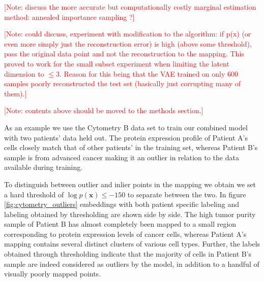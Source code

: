 \textcolor{red}{[Note: discuss the more accurate but computationally costly marginal estimation method: annealed importance sampling \citep{ais, ais_vae}?]}

\textcolor{red}{[Note: could discuss, experiment with modification to the algorithm: if p(x) (or even more simply just the reconstruction error) is high (above some threshold), pass the original data point and not the reconstruction to the mapping. This proved to work for the small subset experiment when limiting the latent dimension to $\leq 3$. Reason for this being that the VAE trained on only 600 samples poorly reconstructed the test set (basically just corrupting many of them).]}

\textcolor{red}{[Note: contents above should be moved to the methods section.]}

As an example we use the Cytometry B data set to train our combined model with two patients' data held out. The protein expression profile of Patient A's cells closely match that of other patients' in the training set, whereas Patient B's sample is from advanced cancer making it an outlier in relation to the data available during training.

To distinguish between outlier and inlier points in the mapping we obtain we set a hard threshold of $\log p(\mathbf{x}) \leq -150$ to separate between the two. In figure \ref{fig:cytometry_outliers} embeddings with both patient specific labeling and labeling obtained by thresholding are shown side by side. The high tumor purity sample of Patient B has almost completely been mapped to a small region corresponding to protein expression levels of cancer cells, whereas Patient A's mapping contains several distinct clusters of various cell types. Further, the labels obtained through thresholding indicate that the majority of cells in Patient B's sample are indeed considered as outliers by the model, in addition to a handful of visually poorly mapped points.

